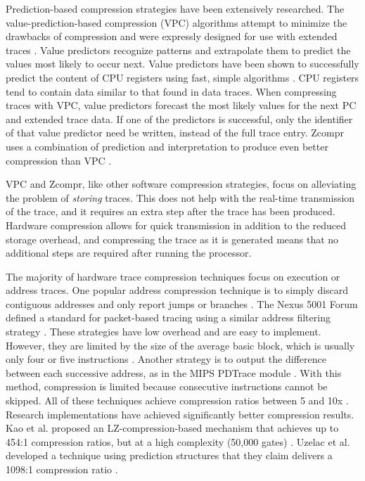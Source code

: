 \documentclass[conference]{IEEEtran}
\begin{document}
Prediction-based compression strategies have been extensively researched. The value-prediction-based compression (VPC) algorithms attempt to minimize the drawbacks of compression and were expressly designed for use with extended traces \cite{vpc}. Value predictors recognize patterns and extrapolate them to predict the values most likely to occur next. Value predictors have been shown to successfully predict the content of CPU registers using fast, simple algorithms \cite{burtscher1999} \cite{gabbay1996} \cite{goeman2001} \cite{rychlik1998} \cite{tullsen1999}. CPU registers tend to contain data similar to that found in data traces. When compressing traces with VPC, value predictors forecast the most likely values for the next PC and extended trace data. If one of the predictors is successful, only the identifier of that value predictor need be written, instead of the full trace entry. Zcompr uses a combination of prediction and interpretation to produce even better compression than VPC \cite{kanev2011}.

VPC and Zcompr, like other software compression strategies, focus on alleviating the problem of \emph{storing} traces. This does not help with the real-time transmission of the trace, and it requires an extra step after the trace has been produced. Hardware compression allows for quick transmission in addition to the reduced storage overhead, and compressing the trace as it is generated means that no additional steps are required after running the processor.

The majority of hardware trace compression techniques focus on execution or address traces. One popular address compression technique is to simply discard contiguous addresses and only report jumps or branches \cite{armspec} \cite{tc1775} \cite{nios2003}. The Nexus 5001 Forum defined a standard for packet-based tracing using a similar address filtering strategy \cite{nexus5001}. These strategies have low overhead and are easy to implement. However, they are limited by the size of the average basic block, which is usually only four or five instructions \cite{rotenberg1999}. Another strategy is to output the difference between each successive address, as in the MIPS PDTrace module \cite{mipspd}. With this method, compression is limited because consecutive instructions cannot be skipped. All of these techniques achieve compression ratios between 5 and 10x \cite{macnamee2000}. Research implementations have achieved significantly better compression results. Kao et al. proposed an LZ-compression-based mechanism that achieves up to 454:1 compression ratios, but at a high complexity (50,000 gates) \cite{kao2007}. Uzelac et al. developed a technique using prediction structures that they claim delivers a 1098:1 compression ratio \cite{uzelac2014}. 
\end{document}
